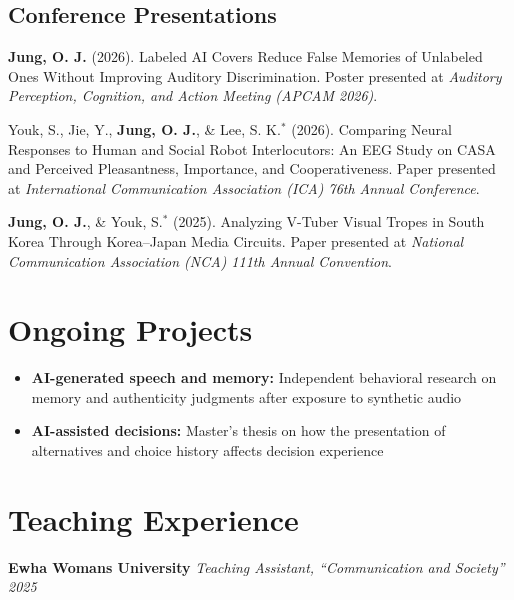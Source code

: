 \documentclass[11pt,a4paper]{article}
\newcommand{\Needspace}[1]{\par\ifdim\dimexpr\pagegoal-\pagetotal\relax<#1\relax\newpage\fi}
\newcommand{\cvactivity}[3]{\noindent\textbf{#1} \textit{#2} \hfill \textit{#3}}
\begin{document}
\subsection*{Conference Presentations}

\begin{enumerate}[leftmargin=*, label={[\arabic*]}, resume, itemsep=2pt]
    \item\label{pub:apcam} \textbf{Jung, O. J.} (2026). Labeled AI Covers Reduce False Memories of Unlabeled Ones Without Improving Auditory Discrimination. Poster presented at \textit{Auditory Perception, Cognition, and Action Meeting (APCAM 2026)}.

    \item Youk, S., Jie, Y., \textbf{Jung, O. J.}, \& Lee, S. K.$^{*}$ (2026). Comparing Neural Responses to Human and Social Robot Interlocutors: An EEG Study on CASA and Perceived Pleasantness, Importance, and Cooperativeness. Paper presented at \textit{International Communication Association (ICA) 76th Annual Conference}.

    \item \textbf{Jung, O. J.}, \& Youk, S.$^{*}$ (2025). Analyzing V-Tuber Visual Tropes in South Korea Through Korea--Japan Media Circuits. Paper presented at \textit{National Communication Association (NCA) 111th Annual Convention}.
\end{enumerate}

\Needspace{12\baselineskip}
\section{Ongoing Projects}
\begin{itemize}[leftmargin=*, itemsep=3pt, topsep=6pt]
    \item \textbf{AI-generated speech and memory:} Independent behavioral research on memory and authenticity judgments after exposure to synthetic audio
    \item \textbf{AI-assisted decisions:} Master's thesis on how the presentation of alternatives and choice history affects decision experience
\end{itemize}

\section{Teaching Experience}

\cvactivity{Ewha Womans University}{Teaching Assistant, ``Communication and Society''}{2025}
\end{document}
